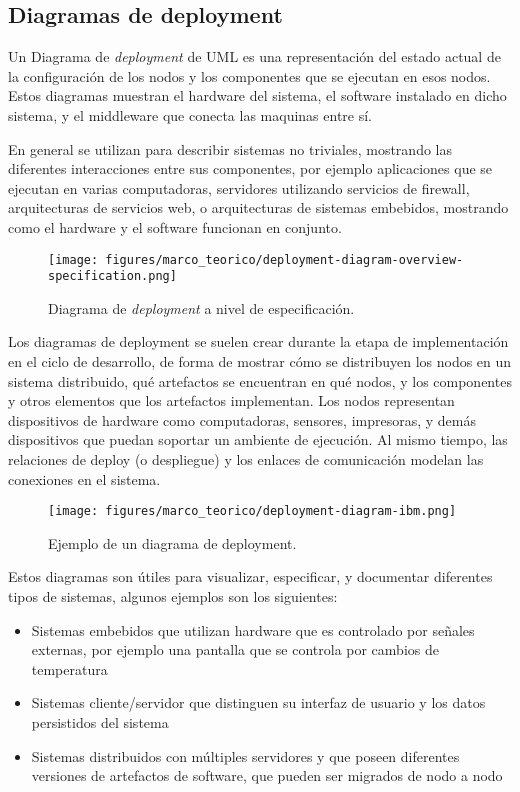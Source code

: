 \subsection{Diagramas de deployment}
Un Diagrama de \textit{deployment} de UML es una representación del estado actual de la configuración de los nodos y los componentes que se ejecutan en esos nodos. Estos diagramas muestran el hardware del sistema, el software instalado en dicho sistema, y el middleware que conecta las maquinas entre sí. \cite{ambler2018deployment}

En general se utilizan para describir sistemas no triviales, mostrando las diferentes interacciones entre sus componentes, por ejemplo aplicaciones que se ejecutan en varias computadoras, servidores utilizando servicios de firewall, arquitecturas de servicios web, o arquitecturas de sistemas embebidos, mostrando como el hardware y el software funcionan en conjunto.

\begin{figure}[htbp]
    \centering
    \texttt{[image: figures/marco\_teorico/deployment-diagram-overview-specification.png]}
    \caption{Diagrama de \textit{deployment} a nivel de especificación. \cite{deploymentdiagramoverview}}
    \label{fig:marco:diagram_overview}
\end{figure}

Los diagramas de deployment se suelen crear durante la etapa de implementación en el ciclo de desarrollo, de forma de mostrar cómo se distribuyen los nodos en un sistema distribuido, qué artefactos se encuentran en qué nodos, y los componentes y otros elementos que los artefactos implementan. Los nodos representan dispositivos de hardware como computadoras, sensores, impresoras, y demás dispositivos que puedan soportar un ambiente de ejecución. Al mismo tiempo, las relaciones de deploy (o despliegue) y los enlaces de comunicación modelan las conexiones en el sistema. \cite{ibmdeploymentdiagrams}

\begin{figure}[htbp]
    \centering
    \texttt{[image: figures/marco\_teorico/deployment-diagram-ibm.png]}
    \caption{Ejemplo de un diagrama de deployment. \cite{ibmdeploymentdiagrams}}
    \label{fig:marco:ibmdeploymentdiagram}
\end{figure}

Estos diagramas son útiles para visualizar, especificar, y documentar diferentes tipos de sistemas, algunos ejemplos son los siguientes: \cite{ibmdeploymentdiagrams}
\begin{itemize}
    \item Sistemas embebidos que utilizan hardware que es controlado por señales externas, por ejemplo una pantalla que se controla por cambios de temperatura
    \item Sistemas cliente/servidor que distinguen su interfaz de usuario y los datos persistidos del sistema
    \item Sistemas distribuidos con múltiples servidores y que poseen diferentes versiones de artefactos de software, que pueden ser migrados de nodo a nodo
\end{itemize}

